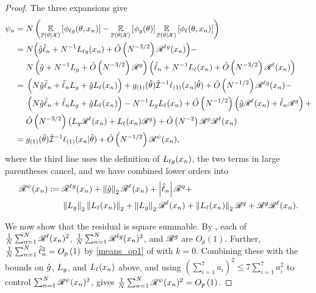 \begin{proof}
The three expansions give
%
\begin{align*}
%
\infl_n ={}&
N \left(
    \expect{\post}{\phi_{\ell\g}(\theta, \x_n)} -
    \expect{\post}{\phi_\g(\theta)} \expect{\post}{\phi_\ell(\theta, \x_n)}
\right)
\\={}&
N \Big(
    \hat\g \hat\ell_n +
    N^{-1} L_{\ell\g}(\x_n) +
    \ordlog{N^{-3/2}} \resid{\ell\g}(\x_n)
\Big) -
\\&
N \left( \hat\g + N^{-1} L_\g + \ordlog{N^{-3/2}} \resid{\g} \right)
\left( \hat\ell_n + N^{-1} L_\ell(\x_n) + \ordlog{N^{-3/2}} \resid{\ell}(\x_n) \right)
\\={}&
\left(N \hat\g \hat\ell_n + \hat\ell_n L_\g + \hat\g L_\ell(\x_n)\right) +
\ggrad{1}(\thetahat) \infohat^{-1} \ellgrad{1}(\x_n \vert \thetahat) +
\ordlog{N^{-1/2}} \resid{\ell\g}(\x_n) -
\\&
\left(N \hat\g \hat\ell_n + \hat\ell_n L_\g + \hat\g L_\ell(\x_n)\right) -
N^{-1} L_\g L_\ell(\x_n) +
\ordlog{N^{-1/2}} \left(
    \hat\g \resid{\ell}(\x_n) + \hat\ell_n \resid{\g}
\right) +
\\&
\ordlog{N^{-3/2}} \left(
    L_\g \resid{\ell}(\x_n) + L_\ell(\x_n) \resid{\g}
\right) +
\ordlog{N^{-2}} \resid{\g} \resid{\ell}(\x_n)
\\={}&
\ggrad{1}(\thetahat) \infohat^{-1} \ellgrad{1}(\x_n \vert \thetahat) +
\ordlog{N^{-1/2}} \resid{\infl}(\x_n),
%
\end{align*}
%
where the third line uses the definition of $L_{\ell g}(x_n)$, the two
terms in large parentheses cancel, and we have combined lower orders into
%
\begin{align*}
%
\resid{\infl}(\x_n) :={}&
\resid{\ell\g}(\x_n) +
\norm{\hat\g}_2 \resid{\ell}(\x_n) +
\abs{\hat\ell_n} \resid{\g} +
\\{}&
\norm{L_\g}_2 \norm{L_\ell(\x_n)}_2 +
\norm{L_\g}_2 \resid{\ell}(\x_n) +
\norm{L_\ell(\x_n)}_2 \resid{\g} +
\resid{\g} \resid{\ell}(\x_n).
%
\end{align*}

We now show that the residual is square summable. By
, each of $\frac{1}{N}\sum_{n=1}^N \mathscr{R}^{\ell}(x_n)^2$, $\frac{1}{N}\sum_{n=1}^N
\mathscr{R}^{\ell g}(x_n)^2$, and $\mathscr{R}^{g}$ are $O_p(1)$.  Further, $\frac{1}{N}\sum_{n=1}^N
\hat\ell_n^2 = O_p\left(1\right)$ by \eqref{means_op1} of  with $k = 0$.
Combining these with the bounds on $\hat{g}$, $L_g$, and $L_\ell(x_n)$ above, and
using $(\sum_{i=1}^7 a_i)^2 \le 7 \sum_{i=1}^7 a_i^2$ to control
$\sum_{n=1}^N \mathscr{R}^{\psi}(x_n)^2$, gives $\frac{1}{N}\sum_{n=1}^N
\mathscr{R}^{\psi}(x_n)^2 = O_p\left(1\right)$.


\end{proof}
